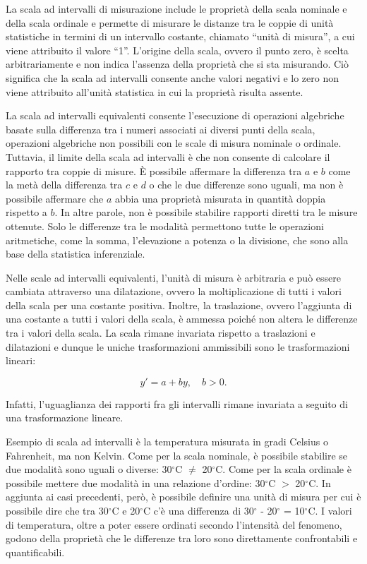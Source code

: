\documentclass[
  letterpaper,
  DIV=11,
  numbers=noendperiod]{scrreprt}
\theoremstyle{definition}
\theoremstyle{remark}
\begin{document}
La scala ad intervalli di misurazione include le proprietà della scala
nominale e della scala ordinale e permette di misurare le distanze tra
le coppie di unità statistiche in termini di un intervallo costante,
chiamato ``unità di misura'', a cui viene attribuito il valore ``1''.
L'origine della scala, ovvero il punto zero, è scelta arbitrariamente e
non indica l'assenza della proprietà che si sta misurando. Ciò significa
che la scala ad intervalli consente anche valori negativi e lo zero non
viene attribuito all'unità statistica in cui la proprietà risulta
assente.

La scala ad intervalli equivalenti consente l'esecuzione di operazioni
algebriche basate sulla differenza tra i numeri associati ai diversi
punti della scala, operazioni algebriche non possibili con le scale di
misura nominale o ordinale. Tuttavia, il limite della scala ad
intervalli è che non consente di calcolare il rapporto tra coppie di
misure. È possibile affermare la differenza tra \(a\) e \(b\) come la
metà della differenza tra \(c\) e \(d\) o che le due differenze sono
uguali, ma non è possibile affermare che \(a\) abbia una proprietà
misurata in quantità doppia rispetto a \(b\). In altre parole, non è
possibile stabilire rapporti diretti tra le misure ottenute. Solo le
differenze tra le modalità permettono tutte le operazioni aritmetiche,
come la somma, l'elevazione a potenza o la divisione, che sono alla base
della statistica inferenziale.

Nelle scale ad intervalli equivalenti, l'unità di misura è arbitraria e
può essere cambiata attraverso una dilatazione, ovvero la
moltiplicazione di tutti i valori della scala per una costante positiva.
Inoltre, la traslazione, ovvero l'aggiunta di una costante a tutti i
valori della scala, è ammessa poiché non altera le differenze tra i
valori della scala. La scala rimane invariata rispetto a traslazioni e
dilatazioni e dunque le uniche trasformazioni ammissibili sono le
trasformazioni lineari:

\[
y' = a + by, \quad b > 0.
\]

Infatti, l'uguaglianza dei rapporti fra gli intervalli rimane invariata
a seguito di una trasformazione lineare.

Esempio di scala ad intervalli è la temperatura misurata in gradi
Celsius o Fahrenheit, ma non Kelvin. Come per la scala nominale, è
possibile stabilire se due modalità sono uguali o diverse: 30\(^\circ\)C
\(\neq\) 20\(^\circ\)C. Come per la scala ordinale è possibile mettere
due modalità in una relazione d'ordine: 30\(^\circ\)C \(>\)
20\(^\circ\)C. In aggiunta ai casi precedenti, però, è possibile
definire una unità di misura per cui è possibile dire che tra
30\(^\circ\)C e 20\(^\circ\)C c'è una differenza di 30\(^\circ\) -
20\(^\circ\) = 10\(^\circ\)C. I valori di temperatura, oltre a poter
essere ordinati secondo l'intensità del fenomeno, godono della proprietà
che le differenze tra loro sono direttamente confrontabili e
quantificabili.
\end{document}
